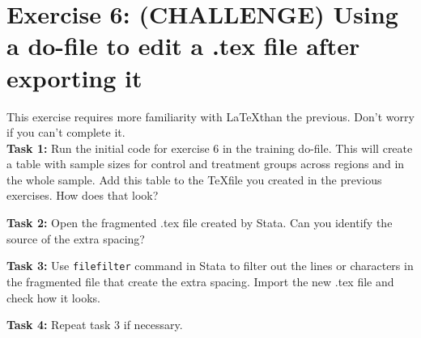 \documentclass[12pts]{report}
\begin{document}
\section*{Exercise 6: (CHALLENGE) Using a do-file to edit a .tex file after exporting it}

This exercise requires more familiarity with \LaTeX \space than the previous. Don't worry if you can't complete it. \\

\textbf{Task 1:} Run the initial code for exercise 6 in the training do-file. This will create a table with sample sizes for control and treatment groups across regions and in the whole sample. Add this table to the \TeX\space file you created in the previous exercises. How does that look?

\textbf{Task 2:} Open the fragmented .tex file created by Stata. Can you identify the source of the extra spacing?

\textbf{Task 3:} Use \texttt{filefilter} command in Stata to filter out the lines or characters in the fragmented file that create the extra spacing. Import the new .tex file and check how it looks.

\textbf{Task 4:} Repeat task 3 if necessary.
\end{document}
